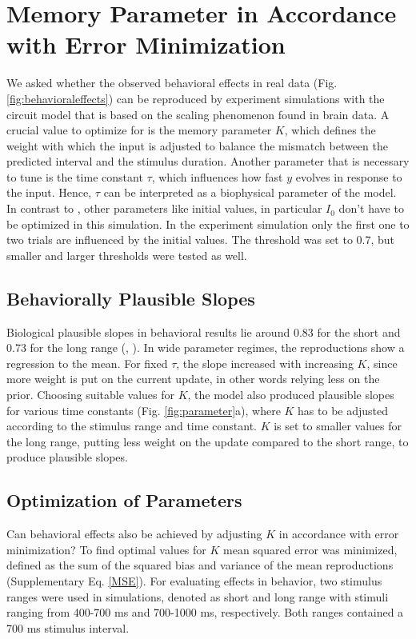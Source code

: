 \documentclass[10pt]{article}
\begin{document}
\section{Memory Parameter in Accordance with Error Minimization}
We asked whether the observed behavioral effects in real data (Fig. \ref{fig:behavioraleffects}) can be reproduced by experiment simulations with the circuit model that is based on the scaling phenomenon found in brain data. 
A crucial value to optimize for is the memory parameter $K$, which defines the weight with which the input is adjusted to balance the mismatch between the predicted interval and the stimulus duration.
Another parameter that is necessary to tune is the time constant $\tau$, which influences how fast $y$ evolves in response to the input. Hence, $\tau$ can be interpreted as a biophysical parameter of the model.
In contrast to \cite{Egger2019}, other parameters like initial values, in particular $I_0$ don't have to be optimized in this simulation. In the experiment simulation only the first one to two trials are influenced by the initial values.
The threshold was set to 0.7, but smaller and larger thresholds were tested as well.

 
\subsection{Behaviorally Plausible Slopes}
Biological plausible slopes in behavioral results lie around 0.83 for the short and 0.73 for the long range (\cite{Thurley2018}, \cite{Jazayeri2010}). 
In wide parameter regimes, the reproductions show a regression to the mean. For fixed $\tau$, the slope increased with increasing $K$, since more weight is put on the current update, in other words relying less on the prior. 
Choosing suitable values for $K$, the model also produced plausible slopes for various time constants (Fig. \ref{fig:parameter}a), where $K$ has to be adjusted according to the stimulus range and time constant. 
$K$ is set to smaller values for the long range, putting less weight on the update compared to the short range, to produce plausible slopes.

\subsection{Optimization of Parameters}
Can behavioral effects also be achieved by adjusting $K$ in accordance with error minimization?
To find optimal values for $K$ mean squared error was minimized, defined as the sum of the squared bias and variance of the mean reproductions (Supplementary Eq. \ref{MSE}).
For evaluating effects in behavior, two stimulus ranges were used in simulations, denoted as short and long range with stimuli ranging from 400-700 ms and 700-1000 ms, respectively. Both ranges contained a 700 ms stimulus interval.
\end{document}
